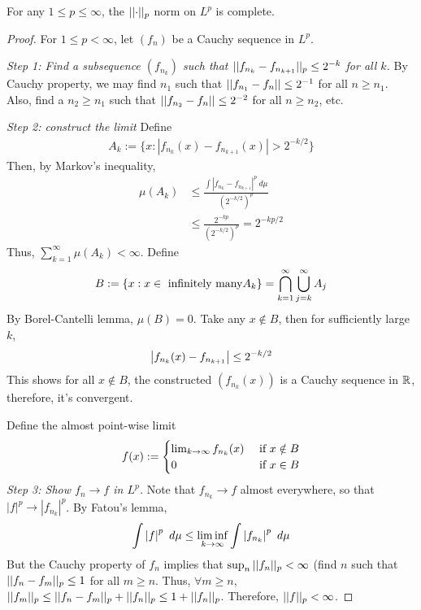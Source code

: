 \documentclass[11pt]{article}
\newcommand{\dmu}[0]{\ d\mu}
\begin{document}
	\begin{theorem}
		For any $1 \leq p \leq \infty$, the $\vert \vert {\cdot} \vert \vert_p$ norm on $L^p$ is complete.
		\begin{proof}
			For $1 \leq p < \infty$, let $(f_n)$ be a Cauchy sequence in $L^p$.
			
			\emph{Step 1: Find a subsequence $(f_{n_k})$ such that $\vert \vert {f_{n_k} - f_{n_{k+1}}} \vert \vert_p \leq 2^{-k}$ for all $k$.} By Cauchy property, we may find $n_1$ such that $\vert \vert {f_{n_1} - f_n} \vert \vert \leq 2^{-1}$ for all $n \geq n_1$. Also, find a $n_2 \geq n_1$ such that $\vert \vert {f_{n_2} - f_n} \vert \vert \leq 2^{-2}$ for all $n \geq n_2$, etc.
			
			\emph{Step 2: construct the limit} Define
			\begin{align}
				A_k := \{x: |f_{n_k}(x) - f_{n_{k+1}}(x)| > 2^{-k/2}\}
			\end{align}
			Then, by Markov's inequality,
			\begin{align}
				\mu(A_k) &\leq \frac{\int |f_{n_k} - f_{n_{k+1}}|^p \dmu}{(2^{-k/2})^p} \\
				&\leq \frac{2^{-kp}}{(2^{-k/2})^p} = 2^{-kp/2}
			\end{align}
			Thus, $\sum_{k=1}^\infty \mu(A_k) < \infty$. Define
			\begin{align}
				B := \{x : x \in \text{{ infinitely many}} A_k\} = \bigcap_{k=1}^\infty \bigcup_{j=k}^\infty A_j
			\end{align}
			By Borel-Cantelli lemma, $\mu(B) = 0$. Take any $x \notin B$, then for sufficiently large $k$,
			\begin{align}
				\left \vert {f_{n_k}(x) - f_{n_{k+1}}} \right \vert \leq 2^{-k/2}
			\end{align}
			This shows for all $x \notin B$, the constructed $(f_{n_k}(x))$ is a Cauchy sequence in $\mathbb{R}$, therefore, it's convergent.
			
			Define the almost point-wise limit
			\begin{align}
				f(x) := \begin{cases}
					\lim_{k \to \infty} f_{n_k}(x) &\text{{ if }} x \notin B \\
					0 &\text{{ if }} x \in B
				\end{cases}
			\end{align}
			\emph{Step 3: Show $f_n \to f$ in $L^p$.} Note that $f_{n_k} \to f$ almost everywhere, so that $|f|^p \to |f_{n_k}|^p$. By Fatou's lemma,
			\begin{align}
				\int \abs{f}^p\dmu \leq \liminf_{k\to\infty} \int \abs{f_{n_k}}^p\dmu
			\end{align}
			But the Cauchy property of $f_n$ implies that $\sup_n \vert \vert {f_n} \vert \vert_p < \infty$ (find $n$ such that $\vert \vert {f_n - f_m} \vert \vert_p \leq 1$ for all $m \geq n$. Thus, $\forall m \geq n$, $\vert \vert {f_m} \vert \vert_p \leq \vert \vert {f_n - f_m} \vert \vert_p + \vert \vert {f_n} \vert \vert_p \leq 1 + \vert \vert {f_n} \vert \vert_p$.
			Therefore, $\vert \vert {f} \vert \vert_p < \infty$.
			

\end{proof}
\end{theorem}
\end{document}
